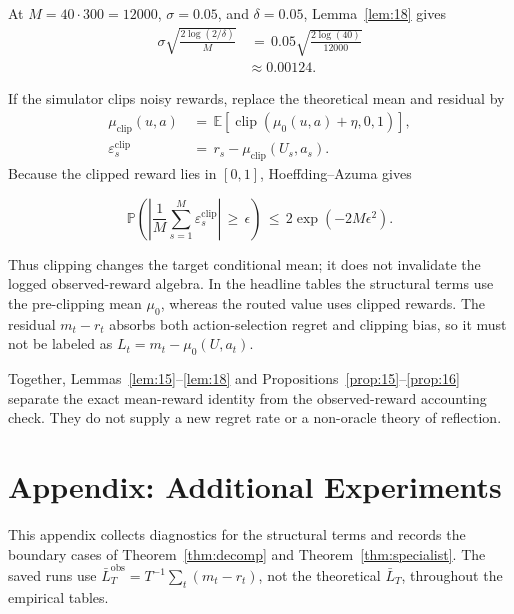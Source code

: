 \documentclass{article} %
\begin{document}
At \(M=40\cdot300=12000\), \(\sigma=0.05\), and \(\delta=0.05\),
Lemma~\ref{lem:18} gives
\begin{equation}
\begin{aligned}
\sigma\sqrt{\frac{2\log(2/\delta)}{M}}
&\,=\,
0.05\sqrt{\frac{2\log(40)}{12000}}
\\
&\approx
0.00124.
\end{aligned}
\end{equation}

If the simulator clips noisy rewards, replace the theoretical mean and
residual by
\begin{equation}
\begin{aligned}
\mu_{\mathrm{clip}}(u,a)
&\,=\,
\mathbb{E}\!\left[
\operatorname{clip}\!\left(\mu_0(u,a)+\eta,0,1\right)
\right],
\\
\varepsilon^{\mathrm{clip}}_s
&\,=\,
r_s-\mu_{\mathrm{clip}}(U_s,a_s).
\end{aligned}
\end{equation}
Because the clipped reward lies in \([0,1]\), Hoeffding--Azuma gives

\begin{equation}
\label{eq:app-six-clipped-tail}
\mathbb{P}\!\left(
\left|
\frac{1}{M}\sum_{s=1}^{M}\varepsilon^{\mathrm{clip}}_s
\right|
\,\ge\,
\epsilon
\right)
\,\le\,
2\exp(-2M\epsilon^2).
\end{equation}

Thus clipping changes the target conditional mean; it does not invalidate the
logged observed-reward algebra. In the headline tables the structural terms use
the pre-clipping mean \(\mu_0\), whereas the routed value uses clipped rewards.
The residual \(m_t-r_t\) absorbs both action-selection regret and clipping
bias, so it must not be labeled as \(L_t=m_t-\mu_0(U,a_t)\).

Together, Lemmas~\ref{lem:15}--\ref{lem:18} and
Propositions~\ref{prop:15}--\ref{prop:16} separate the exact mean-reward
identity from the observed-reward accounting check. They do not supply a new
regret rate or a non-oracle theory of reflection.

\section{Appendix: Additional Experiments}

\label{app:experiments}

This appendix collects diagnostics for the structural terms and records the
boundary cases of Theorem~\ref{thm:decomp} and
Theorem~\ref{thm:specialist}. The saved runs use
\(\bar L_T^{\mathrm{obs}}=T^{-1}\sum_t(m_t-r_t)\), not the theoretical
\(\bar L_T\), throughout the empirical tables.
\end{document}
